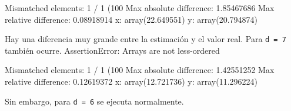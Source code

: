 \documentclass[10pt,a4paper]{article} %
\theoremstyle{definition}
\begin{document}
Mismatched elements: 1 / 1 (100%
Max absolute difference: 1.85467686
Max relative difference: 0.08918914
 x: array(22.649551)
 y: array(20.794874)

 Hay una diferencia muy grande entre la estimación y el valor real. Para \texttt{d = 7} también ocurre.
 AssertionError: 
Arrays are not less-ordered

Mismatched elements: 1 / 1 (100%
Max absolute difference: 1.42551252
Max relative difference: 0.12619372
 x: array(12.721736)
 y: array(11.296224)

 Sin embargo, para \texttt{d = 6} se ejecuta normalmente.

    \nocite{*}
    
    
\end{document}
